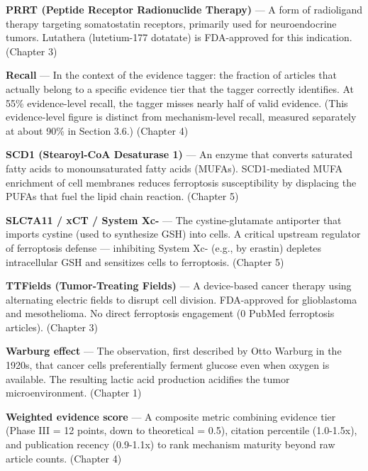 \documentclass[11pt,twoside,openright]{report}
\begin{document}
\textbf{PRRT (Peptide Receptor Radionuclide Therapy)} --- A form of radioligand therapy targeting somatostatin receptors, primarily used for neuroendocrine tumors. Lutathera (lutetium-177 dotatate) is FDA-approved for this indication. (Chapter 3)

\textbf{Recall} --- In the context of the evidence tagger: the fraction of articles that actually belong to a specific evidence tier that the tagger correctly identifies. At 55\% evidence-level recall, the tagger misses nearly half of valid evidence. (This evidence-level figure is distinct from mechanism-level recall, measured separately at about 90\% in Section 3.6.) (Chapter 4)

\textbf{SCD1 (Stearoyl-CoA Desaturase 1)} --- An enzyme that converts saturated fatty acids to monounsaturated fatty acids (MUFAs). SCD1-mediated MUFA enrichment of cell membranes reduces ferroptosis susceptibility by displacing the PUFAs that fuel the lipid chain reaction. (Chapter 5)

\textbf{SLC7A11 / xCT / System Xc-} --- The cystine-glutamate antiporter that imports cystine (used to synthesize GSH) into cells. A critical upstream regulator of ferroptosis defense --- inhibiting System Xc- (e.g., by erastin) depletes intracellular GSH and sensitizes cells to ferroptosis. (Chapter 5)

\textbf{TTFields (Tumor-Treating Fields)} --- A device-based cancer therapy using alternating electric fields to disrupt cell division. FDA-approved for glioblastoma and mesothelioma. No direct ferroptosis engagement (0 PubMed ferroptosis articles). (Chapter 3)

\textbf{Warburg effect} --- The observation, first described by Otto Warburg in the 1920s, that cancer cells preferentially ferment glucose even when oxygen is available. The resulting lactic acid production acidifies the tumor microenvironment. (Chapter 1)

\textbf{Weighted evidence score} --- A composite metric combining evidence tier (Phase III = 12 points, down to theoretical = 0.5), citation percentile (1.0-1.5x), and publication recency (0.9-1.1x) to rank mechanism maturity beyond raw article counts. (Chapter 4)

\printbooknotes

\end{document}
